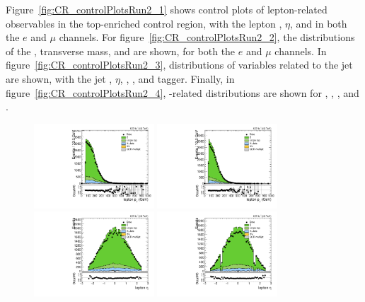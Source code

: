 Figure~\ref{fig:CR_controlPlotsRun2_1} shows control plots of lepton-related observables in the top-enriched control region, with the lepton \pt, $\eta$, and \Etmiss in both the $e$ and $\mu$ channels.
For figure~\ref{fig:CR_controlPlotsRun2_2}, the distributions of the \Wlep \pt, transverse mass, and \MVV are shown, for both the $e$ and $\mu$ channels.
In figure~\ref{fig:CR_controlPlotsRun2_3}, distributions of variables related to the \Vhad jet are shown, with the jet \pt, $\eta$, \MJ, \nsubjDDT, and \DoubleB tagger.
Finally, in figure~\ref{fig:CR_controlPlotsRun2_4}, \VBF-related distributions are shown for \DetaVBF, \mjjVBF, \nJets, and \Dy.

\begin{figure}[htbp]
  \centering
  \includegraphics[width=0.4\textwidth]{fig/controlPlots/CR_b1_mu_allP_allC_allD_Run2_lnujj_l1_l_pt.pdf}
  \includegraphics[width=0.4\textwidth]{fig/controlPlots/CR_b1_e_allP_allC_allD_Run2_lnujj_l1_l_pt.pdf}\\
  \includegraphics[width=0.4\textwidth]{fig/controlPlots/CR_b1_mu_allP_allC_allD_Run2_lnujj_l1_l_eta.pdf}
  \includegraphics[width=0.4\textwidth]{fig/controlPlots/CR_b1_e_allP_allC_allD_Run2_lnujj_l1_l_eta.pdf}\\

\end{figure}

